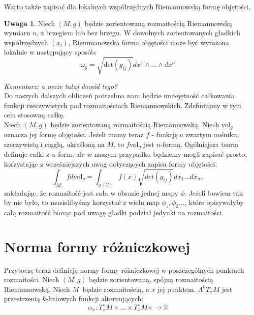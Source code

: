 \documentclass[licencjacka]{pracamgr}
\theoremstyle{definition}
\theoremstyle{definition}
\newtheorem{remark}{Uwaga}[section]
\theoremstyle{plain}
\theoremstyle{plain}
\def\M{\ensuremath M}
\begin{document}
Warto także zapisać dla lokalnych współrzędnych Riemannowską formę objętości. 
\begin{remark} %
Niech $(M, g)$ będzie zorientowaną rozmaitością Riemannowską wymiaru $n$, z
brzegiem lub bez brzegu. W dowolnych zorientowanych gładkich współrzędnych
$(x_i)$, Riemmanowska forma objętości może być wyrażona lokalnie w następujący
sposób:
\[
    \omega_g = \sqrt{\text{det}(g_{ij})} dx^1 \wedge ... \wedge dx^n
\]
\end{remark}
\emph{Komentarz: a może tutaj dowód tego? }\\

Do naszych dalszych obliczeń potrzebna nam będzie umiejętność całkowania
funkcji rzeczywistych pod rozmaitościach Riemannowskich. Zdefiniujmy w tym celu
stosowną całkę. \\

Niech $(M, g)$ będzie zorientowaną rozmaitością Riemannowską. Niech
$\text{vol}_g$ oznacza jej formę objętości. Jeżeli mamy teraz $f$ -
funkcję o zwartym nośniku, rzeczywistą i ciągłą, określoną na $M$, to
$f \text{vol}_g$ jest $n$-formą.  Ogólniejsza teoria definuje całki z
$n$-form, ale w naszym przypadku będziemy mogli zapisać prosto,
korzystając z wcześniejszych uwag dotyczących zapisu formy objętości:
\[ %
  \int_M f d \text{vol}_g = \int_{\phi (U)} f(x) \sqrt{det(g_{ij})} dx_1 ... dx_n,
\]
zakładając, że rozmaitość jest cała w obrazie jednej mapy
$\phi$. Jeżeli bowiem tak by nie było, to musielibyśmy korzystać z
wielu map $\phi_1, \phi_2 ... $, które opisywałyby całą rozmaitość
biorąc pod uwagę gładki podział jedynki na rozmaitości. \\



\section{Norma formy różniczkowej}

Przytoczę teraz definicję normy formy różniczkowej w poszczególnych punktach
rozmaitości. Niech $(M, g)$ będzie zorientowaną, spójną %
rozmaitością Riemannowską. Niech $\M$ będzie rozmaitością, a $x$ jej punktem.
$\Lambda^k T_x M$ jest przestrzenią $k$-liniowych funkcji alternujących:
\[
    \alpha_x:T_x^\star M \times ... \times T_x^\star M \times \rightarrow \mathbb{R}
\] \\
\end{document}
